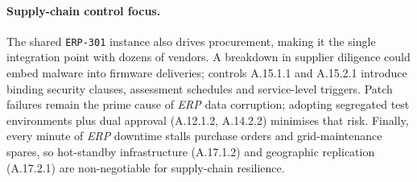 \paragraph{Supply-chain control focus.}
The shared \texttt{ERP-301} instance also drives procurement, making it the single integration point with dozens of vendors.  
A breakdown in supplier diligence could embed malware into firmware deliveries; controls A.15.1.1 and A.15.2.1 introduce binding security clauses, assessment schedules and service-level triggers.  
Patch failures remain the prime cause of \emph{ERP} data corruption; adopting segregated test environments plus dual approval (A.12.1.2, A.14.2.2) minimises that risk.  
Finally, every minute of \emph{ERP} downtime stalls purchase orders and grid-maintenance spares, so hot-standby infrastructure (A.17.1.2) and geographic replication (A.17.2.1) are non-negotiable for supply-chain resilience.
